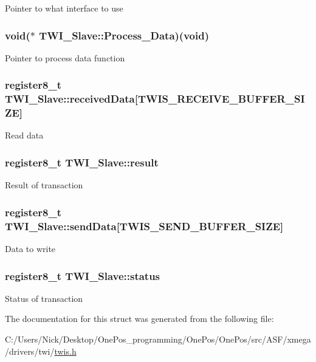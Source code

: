 Pointer to what interface to use \hypertarget{struct_t_w_i___slave_a3b1cd58ff7d3c1ab6112265b652e4356}{
\subsubsection[{Process\-\_\-\-Data}]{\setlength{\rightskip}{0pt plus 5cm}void($\ast$ T\-W\-I\-\_\-\-Slave\-::\-Process\-\_\-\-Data)(void)}}\label{struct_t_w_i___slave_a3b1cd58ff7d3c1ab6112265b652e4356}
Pointer to process data function \hypertarget{struct_t_w_i___slave_a8c205728fdea8bcaeaa0f6f889d83d4d}{
\subsubsection[{received\-Data}]{\setlength{\rightskip}{0pt plus 5cm}register8\-\_\-t T\-W\-I\-\_\-\-Slave\-::received\-Data\mbox{[}T\-W\-I\-S\-\_\-\-R\-E\-C\-E\-I\-V\-E\-\_\-\-B\-U\-F\-F\-E\-R\-\_\-\-S\-I\-Z\-E\mbox{]}}}\label{struct_t_w_i___slave_a8c205728fdea8bcaeaa0f6f889d83d4d}
Read data \hypertarget{struct_t_w_i___slave_a38f52b1274d890275ae25f68d289c8d8}{
\subsubsection[{result}]{\setlength{\rightskip}{0pt plus 5cm}register8\-\_\-t T\-W\-I\-\_\-\-Slave\-::result}}\label{struct_t_w_i___slave_a38f52b1274d890275ae25f68d289c8d8}
Result of transaction \hypertarget{struct_t_w_i___slave_aac95534c65dbda49b778a3a05456682d}{
\subsubsection[{send\-Data}]{\setlength{\rightskip}{0pt plus 5cm}register8\-\_\-t T\-W\-I\-\_\-\-Slave\-::send\-Data\mbox{[}T\-W\-I\-S\-\_\-\-S\-E\-N\-D\-\_\-\-B\-U\-F\-F\-E\-R\-\_\-\-S\-I\-Z\-E\mbox{]}}}\label{struct_t_w_i___slave_aac95534c65dbda49b778a3a05456682d}
Data to write \hypertarget{struct_t_w_i___slave_af5c33c2e305df38d283d66cdd92d8024}{
\subsubsection[{status}]{\setlength{\rightskip}{0pt plus 5cm}register8\-\_\-t T\-W\-I\-\_\-\-Slave\-::status}}\label{struct_t_w_i___slave_af5c33c2e305df38d283d66cdd92d8024}
Status of transaction 

The documentation for this struct was generated from the following file\-:\begin{DoxyCompactItemize}
\item 
C\-:/\-Users/\-Nick/\-Desktop/\-One\-Pos\-\_\-programming/\-One\-Pos/\-One\-Pos/src/\-A\-S\-F/xmega/drivers/twi/\hyperlink{twis_8h}{twis.\-h}\end{DoxyCompactItemize}
